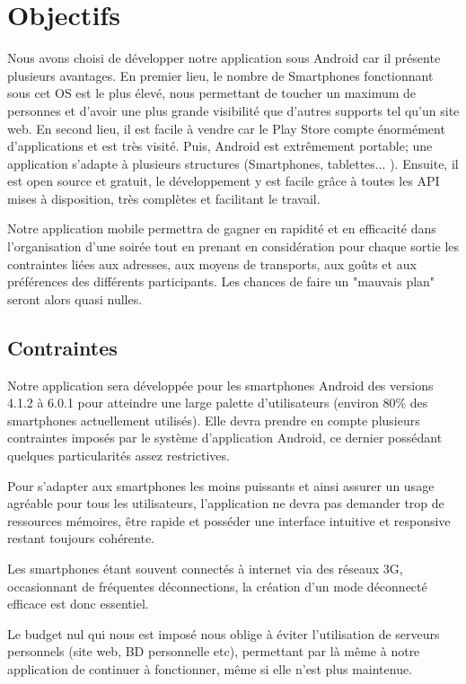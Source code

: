 \documentclass[a4paper, 12pt, notitlepage]{article} %
\begin{document}
\section{Objectifs}
Nous avons choisi de développer notre application sous Android car il présente plusieurs avantages. En premier lieu, le nombre de Smartphones fonctionnant sous cet OS est le plus élevé, nous permettant de toucher un maximum de personnes et d'avoir une plus grande visibilité que d'autres supports tel qu'un site web. En second lieu, il est facile à vendre car le Play Store compte énormément d’applications et est très visité. Puis, Android est extrêmement portable; une application s’adapte à plusieurs structures (Smartphones, tablettes... ). Ensuite, il est open source et gratuit, le développement y est facile grâce à toutes les API mises à disposition, très complètes et facilitant le travail.

Notre application mobile permettra de gagner en rapidité et en efficacité dans l'organisation d'une soirée tout en prenant en considération pour chaque sortie les contraintes liées aux adresses, aux moyens de transports, aux goûts et aux préférences des différents participants. Les chances de faire un "mauvais plan" seront alors quasi nulles.

\subsection{Contraintes}
Notre application sera développée pour les smartphones Android des versions 4.1.2 à 6.0.1 pour atteindre une large palette d'utilisateurs (environ 80\% des smartphones actuellement utilisés). Elle devra prendre en compte plusieurs contraintes imposés par le système d'application Android, ce dernier possédant quelques particularités assez restrictives.

Pour s'adapter aux smartphones les moins puissants et ainsi assurer un usage agréable pour tous les utilisateurs, l'application ne devra pas demander trop de ressources mémoires, être rapide et posséder une interface intuitive et responsive restant toujours cohérente.

Les smartphones étant souvent connectés à internet via des réseaux 3G, occasionnant de fréquentes déconnections, la création d'un mode déconnecté efficace est donc essentiel.

Le budget nul qui nous est imposé nous oblige à éviter l'utilisation de serveurs personnels (site web, BD personnelle etc), permettant par là même à notre application de continuer à fonctionner, même si elle n'est plus maintenue.
\end{document}

